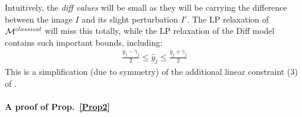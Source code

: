 Intuitively, the {\em diff values} will be small as they will be carrying the difference between the image $I$ and its slight perturbation $I'$.
The LP relaxation of ${\cal M}^{classical}$ will miss this totally, while the LP relaxation of the Diff model contains such important bounds, including: 
\begin{align}
	\label{eq.lpr}
\frac{y_j-\gamma_j}{2} \leq \hat{y}_j \leq \frac{y_j+\gamma_j}{2}
\end{align}
This is a simplification (due to symmetry) of the additional linear constraint (3) of \cite{ITNE}.
	

	\iffalse
\paragraph{A proof of Prop.~\ref{Prop2}}

